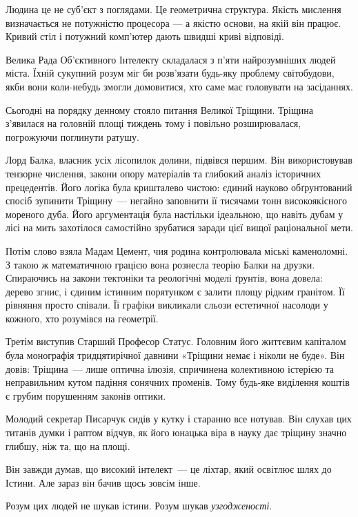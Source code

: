 \documentclass[12pt, a4paper, openany]{book}
\begin{document}
Людина це не суб'єкт з поглядами. Це геометрична структура. Якість мислення визначається не потужністю процесора --- а якістю основи, на якій він працює. Кривий стіл і потужний комп'ютер дають швидші криві відповіді.



\begin{terrybox}
Велика Рада Об'єктивного Інтелекту складалася з п'яти найрозумніших людей міста. Їхній сукупний розум міг би розв'язати будь-яку проблему світобудови, якби вони коли-небудь змогли домовитися, хто саме має головувати на засіданнях.

Сьогодні на порядку денному стояло питання Великої Тріщини. Тріщина з'явилася на головній площі тиждень тому і повільно розширювалася, погрожуючи поглинути ратушу.

Лорд Балка, власник усіх лісопилок долини, підвівся першим. Він використовував тензорне числення, закони опору матеріалів та глибокий аналіз історичних прецедентів. Його логіка була кришталево чистою: єдиний науково обґрунтований спосіб зупинити Тріщину~--- негайно заповнити її тисячами тонн високоякісного мореного дуба. Його аргументація була настільки ідеальною, що навіть дубам у лісі на мить захотілося самостійно зрубатися заради цієї вищої раціональної мети.

Потім слово взяла Мадам Цемент, чия родина контролювала міські каменоломні. З такою ж математичною грацією вона рознесла теорію Балки на друзки. Спираючись на закони тектоніки та реологічні моделі ґрунтів, вона довела: дерево згниє, і єдиним істинним порятунком є залити площу рідким гранітом. Її рівняння просто співали. Її графіки викликали сльози естетичної насолоди у кожного, хто розумівся на геометрії.

Третім виступив Старший Професор Статус. Головним його життєвим капіталом була монографія тридцятирічної давнини «Тріщини немає і ніколи не буде». Він довів: Тріщина~--- лише оптична ілюзія, спричинена колективною істерією та неправильним кутом падіння сонячних променів. Тому будь-яке виділення коштів є грубим порушенням законів оптики.

\medskip
Молодий секретар Писарчук сидів у кутку і старанно все нотував. Він слухав цих титанів думки і раптом відчув, як його юнацька віра в науку дає тріщину значно глибшу, ніж та, що на площі.

Він завжди думав, що високий інтелект~--- це ліхтар, який освітлює шлях до Істини. Але зараз він бачив щось зовсім інше.

Розум цих людей не шукав істини. Розум шукав \textit{узгодженості}.


\end{terrybox}
\end{document}
